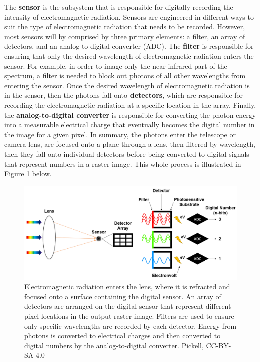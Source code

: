 \documentclass[
]{book}
\begin{document}
The \textbf{sensor} is the subsystem that is responsible for digitally recording the intensity of electromagnetic radiation. Sensors are engineered in different ways to suit the type of electromagnetic radiation that needs to be recorded. However, most sensors will by comprised by three primary elements: a filter, an array of detectors, and an analog-to-digital converter (ADC). The \textbf{filter} is responsible for ensuring that only the desired wavelength of electromagnetic radiation enters the sensor. For example, in order to image only the near infrared part of the spectrum, a filter is needed to block out photons of all other wavelengths from entering the sensor. Once the desired wavelength of electromagnetic radiation is in the sensor, then the photons fall onto \textbf{detectors}, which are responsible for recording the electromagnetic radiation at a specific location in the array. Finally, the \textbf{analog-to-digital converter} is responsible for converting the photon energy into a measurable electrical charge that eventually becomes the digital number in the image for a given pixel. In summary, the photons enter the telescope or camera lens, are focused onto a plane through a lens, then filtered by wavelength, then they fall onto individual detectors before being converted to digital signals that represent numbers in a raster image. This whole process is illustrated in Figure \ref{fig:12-lens-sensor-filter-detector-ADC} below.

\begin{figure}
\includegraphics[width=0.9\linewidth]{images/12-lens-sensor-filter-detector-ADC} \caption{Electromagnetic radiation enters the lens, where it is refracted and focused onto a surface containing the digital sensor. An array of detectors are arranged on the digital sensor that represent different pixel locations in the output raster image. Filters are used to ensure only specific wavelengths are recorded by each detector. Energy from photons is converted to electrical charges and then converted to digital numbers by the analog-to-digital converter. Pickell, CC-BY-SA-4.0}\label{fig:12-lens-sensor-filter-detector-ADC}
\end{figure}
\end{document}

